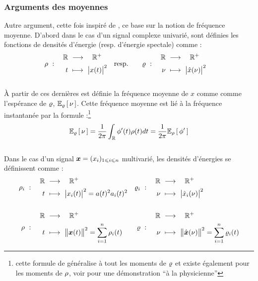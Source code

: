 \subsubsection*{Arguments des moyennes}

Autre argument, cette fois inspiré de \cite{cano_mathematical_2022}, ce base sur la notion de fréquence moyenne.
D'abord dans le cas d'un signal complexe univarié, sont définies les fonctions de densités d'énergie (resp. d'énergie spectale) comme :
\begin{align}\label{eq:densi_dE}
	\densit\ &:\quad \begin{aligned}\R\ &\lr\quad \R^+ \\ t\ &\longmapsto\ \big|x(t)\big|^2 \end{aligned}  
	&
	\text{resp.}\qquad \densis\ &:\quad \begin{aligned}\R\ &\lr\quad \R^+ \\ \nu\ &\longmapsto\ \big|\fou{x}(\nu)\big|^2 \end{aligned}
\end{align}
\\
À partir de ces dernières est définie la fréquence moyenne de $x$ comme comme l'espérance de $\densis$, $\esp[\densis]{\nu}$. Cette fréquence moyenne est lié à la fréquence instantanée par la formule :\footnote{cette formule de généralise à tout les moments de $\densis$ et existe également pour les moments de $\densit$, voir \cite[sec. 1.4]{cohen_time_1995} pour une démonstration ``à la physicienne''}
\begin{equation}\label{eq:esp_freq}
	\esp[\densis]{\nu} = \frac{1}{2\pi}\int_\R \phi'(t)\densit(t)dt = \frac{1}{2\pi} \esp[\densit]{\phi'}
\end{equation}
\\
Dans le cas d'un signal $\x=(x_i)_{1\leq i\leq n}$ multivarié, les densités d'énergies se définissent comme :
\begin{align*}%
	\densit_i\ &:\quad \begin{aligned}\R\ &\lr\quad \R^+ \\ t\ &\longmapsto\ \big|x_i(t)\big|^2 = a(t)^2 a_i(t)^2 \end{aligned}  
	&
	\densis_i\ &:\quad \begin{aligned}\R\ &\lr\quad \R^+ \\ \nu\ &\longmapsto\ \big|\fou{x}_i(\nu)\big|^2 \end{aligned} \\ \\
	\densit\ &:\quad \begin{aligned}\R\ &\lr\quad \R^+ \\ t\ &\longmapsto\ \big\|\x(t)\big\|^2 = \sum_{i=1}^n \densit_i(t) \end{aligned}  
	&
	\densis\ &:\quad \begin{aligned}\R\ &\lr\quad \R^+ \\ \nu\ &\longmapsto\ \big\|\fou{\x}(\nu)\big\|^2 = \sum_{i=1}^n \densis_i(t) \end{aligned}	
\end{align*}
